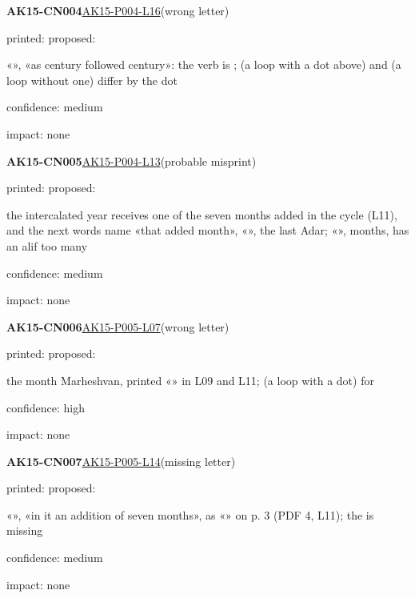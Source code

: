 \documentclass[11pt]{article}
\begin{document}
\noindent\textbf{AK15-CN004}\enspace\hyperlink{AK15-P004-L16}{AK15-P004-L16}\enspace(wrong letter)\par\noindent printed: \enspace proposed: \par\noindent «», «as century followed century»: the verb is ;  (a loop with a dot above) and  (a loop without one) differ by the dot\par\noindent confidence: medium\par\noindent impact: none\par\medskip
\noindent\textbf{AK15-CN005}\enspace\hyperlink{AK15-P004-L13}{AK15-P004-L13}\enspace(probable misprint)\par\noindent printed: \enspace proposed: \par\noindent the intercalated year receives one of the seven months added in the cycle (L11), and the next words name «that added month», «», the last Adar; «», months, has an alif too many\par\noindent confidence: medium\par\noindent impact: none\par\medskip
\noindent\textbf{AK15-CN006}\enspace\hyperlink{AK15-P005-L07}{AK15-P005-L07}\enspace(wrong letter)\par\noindent printed: \enspace proposed: \par\noindent the month Marheshvan, printed «» in L09 and L11;  (a loop with a dot) for \par\noindent confidence: high\par\noindent impact: none\par\medskip
\noindent\textbf{AK15-CN007}\enspace\hyperlink{AK15-P005-L14}{AK15-P005-L14}\enspace(missing letter)\par\noindent printed: \enspace proposed: \par\noindent «», «in it an addition of seven months», as «» on p. 3 (PDF 4, L11); the  is missing\par\noindent confidence: medium\par\noindent impact: none\par\medskip
\end{document}
